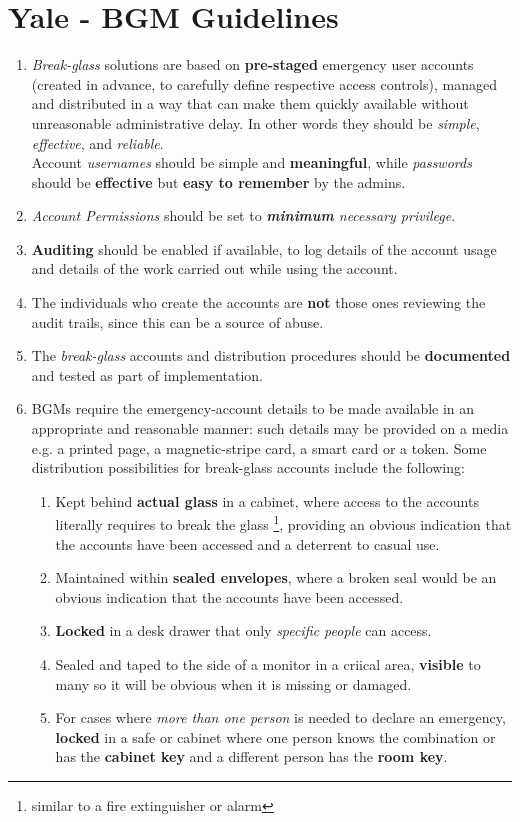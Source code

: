 \section{Yale - BGM Guidelines}
\begin{enumerate}
   \item \textit{Break-glass} solutions are based on \textbf{pre-staged} emergency user accounts (created in advance, to carefully define respective access controls),
   managed and distributed in a way that can make them quickly available
   without unreasonable administrative delay. 
   In other words they should be \textit{simple},
   \textit{effective}, and \textit{reliable}.\\
   Account \textit{usernames} should be simple and \textbf{meaningful}, while \textit{passwords} should be \textbf{effective} but \textbf{easy to remember} by the admins.

   \item \textit{Account Permissions} should be set to \textit{\textbf{minimum} necessary privilege}.
   \item \textbf{Auditing} should be enabled if available, to log details of the account usage and
   details of the work carried out while using the account.
   \item The individuals who create the accounts are \textbf{not} those ones reviewing the audit trails, since this can be a source of abuse.
   \item The \textit{break-glass} accounts and distribution procedures should be \textbf{documented}
   and tested as part of implementation.
   \item BGMs require the emergency-account details to be made available in an appropriate and reasonable manner: such details may be provided on a media
   e.g. a printed page, a magnetic-stripe card, a smart card or a token. 
   Some distribution possibilities for break-glass accounts include the following:
   \begin{enumerate}
      \item Kept behind \textbf{actual glass} in a cabinet, where access to the accounts literally requires 
      to break the glass \footnote{similar to a fire extinguisher or alarm},
      providing an obvious indication that the accounts have been accessed and a deterrent to casual use.
      \item Maintained within \textbf{sealed envelopes}, where a broken seal would be an obvious
      indication that the accounts have been accessed.
      \item \textbf{Locked} in a desk drawer that only \textit{specific people} can access.
      \item Sealed and taped to the side of a monitor in a criical area,
      \textbf{visible} to many so it
      will be obvious when it is missing or damaged.
      \item For cases where \textit{more than one person} is needed to declare an emergency,
      \textbf{locked} in a safe or cabinet where one person knows the combination or has the
      \textbf{cabinet key} and a different person has the \textbf{room key}.
   \end{enumerate}
\end{enumerate}

